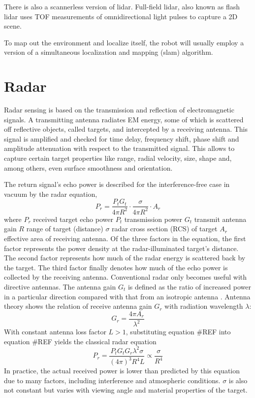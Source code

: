 There is also a scannerless version of lidar. Full-field lidar, also
known as flash lidar \cite{Payne2008} uses TOF measurements of
omnidirectional light pulses to capture a 2D scene.

To map out the environment and localize itself, the robot will usually
employ a version of a simultaneous localization and mapping (slam)
algorithm\cite{Cadena2016}.

\section{Radar}\label{radar}

Radar sensing is based on the transmission and reflection of
electromagnetic signals. A transmitting antenna radiates EM energy, some
of which is scattered off reflective objects, called targets, and
intercepted by a receiving antenna. This signal is amplified and checked
for time delay, frequency shift, phase shift and amplitude attenuation
with respect to the transmitted signal. This allows to capture certain
target properties like range, radial velocity, size, shape and, among
others, even surface smoothness and orientation. \cite{Skolnik2008}

The return signal's echo power is described for the interference-free
case in vacuum by the radar equation, \[
P_r = 
\frac{P_t G_t}{4\pi R^2}
\cdot
\frac{\sigma}{4\pi R^2}
\cdot
A_r
\] where \(P_r\) received target echo power \(P_t\) transmission power
\(G_t\) transmit antenna gain \(R\) range of target (distance)
\(\sigma\) radar cross section (RCS) of target \(A_r\) effective area of
receiving antenna. Of the three factors in the equation, the first
factor represents the power density at the radar-illuminated target's
distance. The second factor represents how much of the radar energy is
scattered back by the target. The third factor finally denotes how much
of the echo power is collected by the receiving antenna.
\cite{Skolnik2008} Conventional radar only becomes useful with directive
antennas. The antenna gain \(G_t\) is defined as the ratio of increased
power in a particular direction compared with that from an isotropic
antenna \cite{Adams2012}. Antenna theory shows \cite{Balanis2015} the
relation of receive antenna gain \(G_r\) with radiation wavelength
\(\lambda\): \[G_r = \frac{4\pi A_r}{\lambda^2}\] With constant antenna
loss factor \(L>1\), substituting equation \#REF into equation \#REF
yields the classical radar equation \[
P_r =
\frac{P_t G_t G_r \lambda^2 \sigma}{(4\pi)^3R^4L}
\propto \frac{\sigma}{R^4}
\] In practice, the actual received power is lower than predicted by
this equation due to many factors, including interference and
atmospheric conditions. \(\sigma\) is also not constant but varies with
viewing angle and material properties of the target. \cite{Adams2012}

